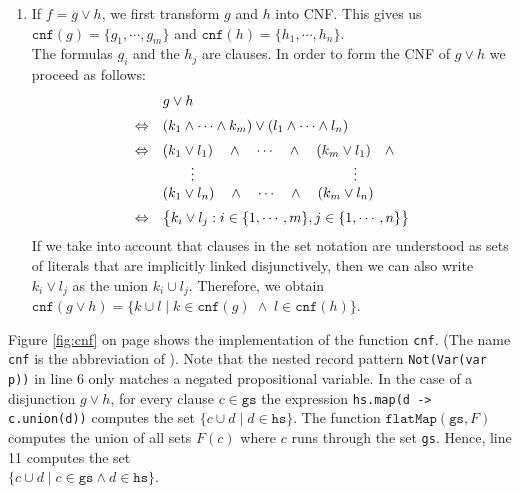 \begin{enumerate}
\item If $f = g \vee h$, we first transform $g$ and $h$ into CNF.
      This gives us \\[0.2cm]
      \hspace*{1.3cm} 
      $\texttt{cnf}(g) = \{ g_1, \cdots, g_m \}$ \quad and \quad
      $\texttt{cnf}(h) = \{ h_1, \cdots, h_n \}$. \\[0.2cm]
      The formulas $g_i$ and the $h_j$ are clauses.  In order to  form the CNF of $g \vee h$
      we proceed as follows: 
      $$
      \begin{array}[c]{ll}
        & g \vee h \\[0.2cm]
      \Leftrightarrow & (k_1 \wedge \cdots \wedge k_m) \vee (l_1 \wedge \cdots \wedge l_n) \\[0.2cm]
      \Leftrightarrow & (k_1 \vee l_1) \quad \wedge \quad \cdots \quad \wedge \quad (k_m \vee l_1) \quad \wedge \\ 
                      & \qquad \vdots \hspace*{4cm} \vdots \\
                      & (k_1 \vee l_n) \quad \wedge \quad \cdots \quad \wedge \quad (k_m \vee l_n) \\[0.2cm] 
      \Leftrightarrow & \bigl\{ k_i \vee l_j : i \in \{ 1, \cdots, m\}, j \in \{ 1, \cdots, n \} \bigr\} \\ 
      \end{array}
      $$
      If we take into account that clauses in the set notation are understood as sets of
      literals that are implicitly linked disjunctively, then we can also write
      $k_i \vee l_j$ as the union $k_i \cup l_j$.   Therefore, we obtain 
      \\[0.2cm]
      \hspace*{1.3cm} 
      $\texttt{cnf}(g \vee h) = \bigl\{ k \cup l \mid k \in \texttt{cnf}(g) \;\wedge\; l \in \texttt{cnf}(h) \bigr\}$.
\end{enumerate}
Figure \ref{fig:cnf} on page \pageref{fig:cnf} shows the implementation of the function
\texttt{cnf}.
(The name \texttt{cnf} is the abbreviation of ).
Note that the nested record pattern \texttt{Not(Var(var p))} in line 6 only matches a negated propositional
variable.  In the case of a disjunction $g \vee h$, for every clause $c \in \texttt{gs}$ the expression
\texttt{hs.map(d -> c.union(d))} computes the set $\{ c \cup d \mid d \in \texttt{hs} \}$.  The function
$\texttt{flatMap}(\texttt{gs}, F)$ computes the union of all sets $F(c)$ where $c$ runs through the set
\texttt{gs}.  Hence, line 11 computes the set
\\[0.2cm]
\hspace*{1.3cm}
$\bigl\{ c \cup d \mid c \in \texttt{gs} \wedge d \in \texttt{hs} \bigr\}$.

